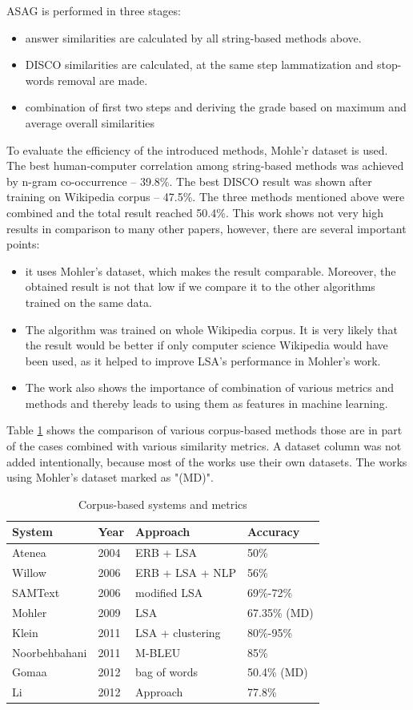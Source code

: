 ASAG is performed in three stages:
\begin{itemize}
\item answer similarities are calculated by all string-based methods above.
\item DISCO similarities are calculated, at the same step lammatization and stop-words removal are made.
\item combination of first two steps and deriving the grade based on maximum and average overall similarities
\end{itemize}
To evaluate the efficiency of the introduced methods, Mohle'r dataset is used. The best human-computer correlation among string-based methods was achieved by n-gram co-occurrence -- 39.8\%. The best DISCO result was shown after training on Wikipedia corpus -- 47.5\%. The three methods mentioned above were combined and the total result reached 50.4\%. This work shows not very high results in comparison to many other papers, however, there are several important points:
\begin{itemize}
\item it uses Mohler's dataset, which  makes the result comparable. Moreover, the obtained result is not that low if we compare it to the other algorithms trained on the same data.
\item The algorithm was trained on whole Wikipedia corpus. It is very likely that the result would be better if only computer science Wikipedia would have been used, as it helped to improve LSA's performance in Mohler's work.
\item The work also shows the importance of combination of various metrics and methods and thereby leads to using them as features in machine learning.
\end{itemize}
 
Table \ref{Corpus} shows the comparison of various corpus-based methods those are in part of the cases combined with various similarity metrics. A dataset column was not added intentionally, because most of the works use their own datasets. The works using Mohler's dataset marked as "(MD)".
 
\begin{table}[h!]
\centering
\caption{Corpus-based systems and metrics}
\label{Corpus}
\begin{tabular}{|l|l|l|l|}
\hline
 System & Year & Approach & Accuracy \\ \hline
 Atenea & 2004 & ERB + LSA & 50\% \\ \hline
 Willow & 2006 & ERB + LSA + NLP & 56\% \\ \hline
 SAMText & 2006 & modified LSA & 69\%-72\% \\ \hline
 Mohler & 2009 & LSA & 67.35\% (MD) \\ \hline
 Klein & 2011 & LSA + clustering &  80\%-95\% \\ \hline
 Noorbehbahani & 2011 & M-BLEU & 85\% \\ \hline
 Gomaa & 2012 & bag of words & 50.4\% (MD) \\ \hline
 Li & 2012 & Approach & 77.8\% \\ \hline
\end{tabular}
\end{table}
 
